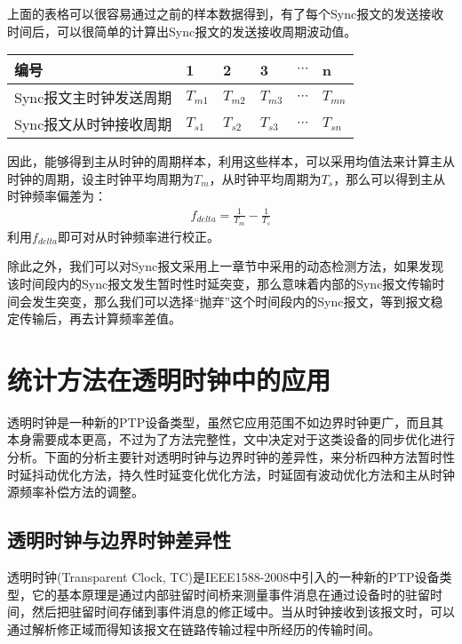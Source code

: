 上面的表格可以很容易通过之前的样本数据得到，有了每个Sync报文的发送接收时间后，可以很简单的计算出Sync报文的发送接收周期波动值。
\begin{table}[htpb]
  \centering
  \begin{tabular}{llllll} \toprule
    编号 & 1 & 2 & 3 & $\cdots$ & n \\ \midrule
    Sync报文主时钟发送周期 & $T_{m1}$ & $T_{m2}$ & $T_{m3}$ & $\cdots$ & $T_{mn}$ \\ \midrule
    Sync报文从时钟接收周期 & $T_{s1}$ & $T_{s2}$ & $T_{s3}$ & $\cdots$ & $T_{sn}$  \\ \bottomrule
  \end{tabular}
\end{table}

因此，能够得到主从时钟的周期样本，利用这些样本，可以采用均值法来计算主从时钟的周期，设主时钟平均周期为$T_{m}$，从时钟平均周期为$T_{s}$，那么可以得到主从时钟频率偏差为：
\begin {align}
f_{delta} = \frac{1}{T_{m}} - \frac{1}{T_{s}}
\end{align}
利用$f_{delta}$即可对从时钟频率进行校正。

除此之外，我们可以对Sync报文采用上一章节中采用的动态检测方法，如果发现该时间段内的Sync报文发生暂时性时延突变，那么意味着内部的Sync报文传输时间会发生突变，那么我们可以选择“抛弃”这个时间段内的Sync报文，等到报文稳定传输后，再去计算频率差值。

\section{统计方法在透明时钟中的应用}
透明时钟是一种新的PTP设备类型，虽然它应用范围不如边界时钟更广，而且其本身需要成本更高，不过为了方法完整性，文中决定对于这类设备的同步优化进行分析。下面的分析主要针对透明时钟与边界时钟的差异性，来分析四种方法暂时性时延抖动优化方法，持久性时延变化优化方法，时延固有波动优化方法和主从时钟源频率补偿方法的调整。

\subsection{透明时钟与边界时钟差异性}
透明时钟(Transparent Clock, TC)是IEEE1588-2008中引入的一种新的PTP设备类型，它的基本原理是通过内部驻留时间桥来测量事件消息在通过设备时的驻留时间，然后把驻留时间存储到事件消息的修正域中。当从时钟接收到该报文时，可以通过解析修正域而得知该报文在链路传输过程中所经历的传输时间。

